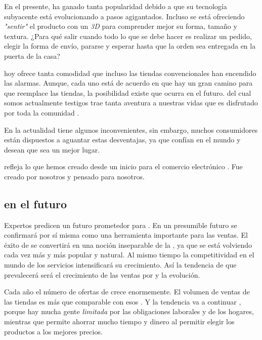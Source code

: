 			En el presente, \ecommerceCOM ha ganado tanta popularidad debido a que su tecnología subyacente está evolucionando a pasos agigantados. Incluso se está ofreciendo \textit{"sentir"} el producto con un \mousePC \textit{3D} para comprender mejor su forma, tamaño y textura. ¿Para qué salir cuando todo lo que se debe hacer es realizar un pedido, elegir la forma de envío, pararse y esperar hasta que la orden sea entregada en la puerta de la casa?

			\ecommerceCOM hoy ofrece tanta comodidad que incluso las tiendas convencionales han encendido las alarmas. Aunque, cada uno está de acuerdo en que hay un gran camino para que \ecommerceCOM reemplace las tiendas, la posibilidad existe que ocurra en el futuro. \ecommerceCOM del cual somos actualmente testigos trae tanta aventura a nuestras vidas que es disfrutado por toda la comunidad \online.

			En la actualidad \ecommerceCOM tiene algunos inconvenientes, sin embargo, muchos consumidores están dispuestos a aguantar estas desventajas, ya que confían en el mundo \online y desean que sea un mejor lugar.

			\ecommerceCOM refleja lo que hemos creado desde un inicio para el comercio electrónico \online. Fue creado por nosotros y pensado para nosotros.

		\subsection{\ecommerceCOM en el futuro}

			Expertos predicen un futuro prometedor para \ecommerceCOM. En un presumible futuro \ecommerceCOM se confirmará por sí misma como una herramienta importante para las ventas. El éxito de \ecommerceCOM se convertirá en una noción inseparable de la \webINT, ya que \eshopping se está volviendo cada vez más y más popular y natural. Al mismo tiempo la competitividad en el mundo de los servicios \ecommerceCOM intensificará su crecimiento. Así la tendencia de que prevalecerá \ecommerceCOM será el crecimiento de las ventas por \internetINT y la evolución.

			Cada año el número de ofertas de \ecommerceCOM crece enormemente. El volumen de ventas de las tiendas \online  es más que comparable con esos \brickandmortar. Y la tendencia va a continuar \cite{online_growth_ecommerce}, porque hay mucha gente \textit{limitada} por las obligaciones laborales y de los hogares, mientras que \internetINT permite ahorrar mucho tiempo y dinero al permitir  elegir los productos a los mejores precios. 

